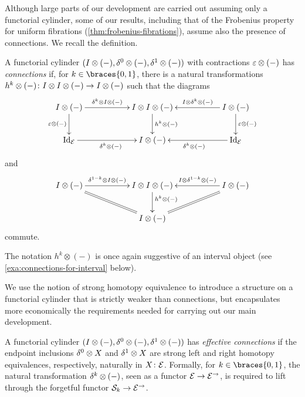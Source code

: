 \documentclass[reqno,10pt,a4paper,oneside,draft]{amsart}
\begin{document}
Although large parts of our development are carried out assuming only a functorial cylinder, some of our results, including that of the Frobenius property for uniform fibrations (\cref{thm:frobenius-fibrations}), assume also the presence of connections.
We recall the definition.

\begin{definition} \label{def:connections}
A functorial cylinder $(I \otimes (-), \delta^0 \otimes (-), \delta^1 \otimes (-))$ with contractions $\varepsilon \otimes (-)$ has \emph{connections} if, for $k \in \braces{0, 1}$, there is a natural transformations $h^k \otimes (-) \colon I \otimes I \otimes (-) \to I \otimes (-)$ such that the diagrams
\begin{equation} \label{connections:0}
\xymatrix@C+3em{
  \interval \otimes (-)
  \ar[r]^-{\kcyl \otimes \interval \otimes (-)}
  \ar[d]_{\ccyl \otimes (-)}
&
  \interval \otimes \interval \otimes (-)
  \ar[d]^{h^k \otimes (-)}
&
  \interval \otimes (-)
  \ar[l]_-{\interval \otimes \kcyl \otimes (-)}
  \ar[d]^{\ccyl \otimes (-)}
\\
  \Id_\catE
  \ar[r]_{\kcyl \otimes (-)}
&
  \interval \otimes (-)
&
  \Id_\catE
  \ar[l]^{\kcyl \otimes (-)}
}
\end{equation}
and
\begin{equation} \label{connections:1}
\xymatrix@C+3em{
  \interval \otimes (-)
  \ar[r]^-{\kcylinv \otimes \interval \otimes (-)}
  \ar@{=}[dr]
&
  \interval \otimes \interval \otimes (-)
  \ar[d]^(0.4){h^k \otimes (-)}
&
  \interval \otimes (-)
  \ar[l]_-{\interval \otimes \kcylinv \otimes (-)}
  \ar@{=}[dl]
\\&
  \interval \otimes (-)
}
\end{equation}
commute.
\end{definition}

The notation $h^k \otimes (-)$ is once again suggestive of an interval object (see \cref{exa:connections-for-interval} below).

We use the notion of strong homotopy equivalence to introduce a structure on a functorial cylinder that is strictly weaker than connections, but encapsulates more economically the requirements needed for carrying out our main development.

\begin{definition} \label{def:effective-connections}
A functorial cylinder $(I \otimes (-), \delta^0 \otimes (-), \delta^1 \otimes (-))$ has \emph{effective connections} if the endpoint inclusions $\delta^0 \otimes X$ and $\delta^1 \otimes X$ are strong left and right homotopy equivalences, respectively, naturally in $X \colon \mathcal{E}$.
Formally, for $k \in \braces{0, 1}$, the natural transformation $\delta^k \otimes (-)$, seen as a functor $\mathcal{E} \to \mathcal{E}^\to$, is required to lift through the forgetful functor $\mathcal{S}_k \to \mathcal{E}^\to$.
\end{definition}
\end{document}

